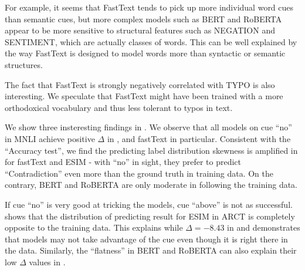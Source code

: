 For example, it seems that FastText tends to pick up more individual word cues
than semantic cues, but more complex models such as BERT
and RoBERTA appear to be more sensitive to structural features such as NEGATION
and SENTIMENT, which are actually classes of words. 
This can be well explained by the way FastText is designed to
model words more than syntactic or semantic structures.

The fact that FastText is strongly negatively correlated with TYPO is
also interesting. We speculate that FastText might have been
trained with a more orthodoxical vocabulary and thus less
tolerant to typos in text. 

We show three insteresting findings in . 
We observe that all models on cue ``no'' in MNLI 
achieve positive $\Delta$ in , and fastText in particular. 
Consistent with the ``Accuracy test'', we find the predicting label distribution 
skewness is amplified in  for fastText and ESIM -  
with ``no'' in sight, they prefer to predict ``Contradiction'' even more
than the ground truth in training data.
On the contrary, BERT and RoBERTA are only moderate in following
the training data. 

If cue ``no'' is very good at tricking the models,
cue ``above'' is not as successful. 
 shows that 
the distribution of predicting result for ESIM in ARCT 
is completely opposite to the training data. 
This explains while $\Delta=-8.43$ in  and
demonstrates that models may not take advantage of the cue even though it is
right there in the data.
Similarly, the ``flatness'' in BERT and RoBERTA 
can also explain their low $\Delta$ values in . 


